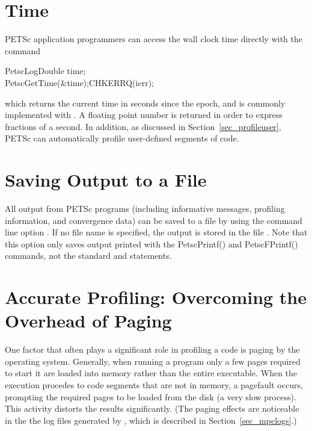 {{%
\section{Time}

PETSc application programmers can access the wall clock time directly 
with the command 
\begin{tabbing}
  PetscLogDouble time;\\
  PetscGetTime(\&time);CHKERRQ(ierr);
\end{tabbing}
which returns the current time in seconds since the epoch, and is commonly
implemented with . A floating point number is returned in order
to express fractions of a second. In addition, as discussed in Section~\ref{sec_profileuser},
PETSc can automatically profile user-defined segments of code.

\section{Saving Output to a File}

All output from PETSc programs (including informative messages, profiling information,
and convergence data) can be saved to a file by using the command line
option . 
If no file name is specified, the output is stored in the file .
 Note that this option only saves output printed with 
the PetscPrintf() and PetscFPrintf() commands, not the
standard  and  statements. 

\section{Accurate Profiling: Overcoming the Overhead of Paging}
\label{sec_profaccuracy}

One factor that often plays a significant role in profiling a code is
paging by the operating system.  Generally, when running a program
only a few pages required to start it are loaded into memory rather
than the entire executable.  When the execution procedes to code
segments that are not in memory, a pagefault occurs, prompting the
required pages to be loaded from the disk (a very slow process).  This
activity distorts the results significantly. (The paging effects are
noticeable in the the log files generated by , which is
described in Section~\ref{sec_mpelogs}.)

}}
